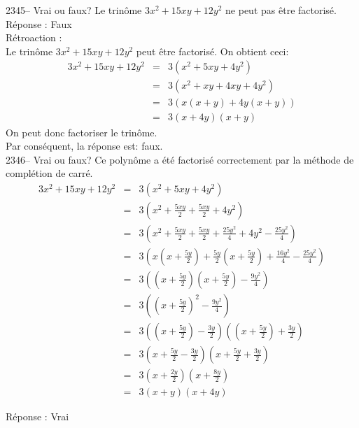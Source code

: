 \documentclass[letterpaper, 12pt]{article}
\begin{document}
2345-- Vrai ou faux? Le trin\^ome $3x^{2}+15xy+12y^{2}$ ne peut pas \^etre factoris\'e.\\

R\'eponse : Faux\\

R\'etroaction :\\
Le trin\^ome $3x^{2}+15xy+12y^{2}$ peut \^etre factoris\'e. On obtient ceci:
\begin{eqnarray*}
3x^{2}+15xy+12y^{2}&=&3(x^{2}+5xy+4y^{2})\\[2mm]
&=&3\left( x^{2}+xy+4xy+4y^{2}\right) \\[2mm]
&=&3\left( x(x+y)+4y(x+y)\right) \\[2mm]
&=&3(x+4y)(x+y)
\end{eqnarray*}
On peut donc factoriser le trin\^ome.\\
Par cons\'equent, la r\'eponse est: faux.\\

2346-- Vrai ou faux? Ce polyn\^ome a \'et\'e factoris\'e correctement par la m\'ethode de compl\'etion de carr\'e.
\begin{eqnarray*}
3x^{2}+15xy+12y^{2}&=&3(x^{2}+5xy+4y^{2})\\[2mm]
&=&3\left(x^{2}+\frac{5xy}{2}+\frac{5xy}{2}+4y^{2}\right)\\[2mm]
&=&3\left(x^{2}+\frac{5xy}{2}+\frac{5xy}{2}+\frac{25y^{2}}{4}+4y^{2}-\frac{25y^{2}}{4}\right)\\[2mm]
&=&3\left(x\left(x+\frac{5y}{2}\right)+\frac{5y}{2}\left(x+\frac{5y}{2}\right)+ \frac{16y^{2}}{4}-\frac{25y^{2}}{4}\right)\\[2mm]
&=&3\left(\left(x+\frac{5y}{2}\right)\left(x+\frac{5y}{2}\right)-\frac{9y^{2}}{4}\right)\\[2mm]
&=&3\left(\left(x+\frac{5y}{2}\right)^{2}-\frac{9y^{2}}{4}\right)\\[2mm]
&=&3\left(\left(x+\frac{5y}{2}\right)-\frac{3y}{2}\right) \left(\left(x+\frac{5y}{2}\right)+\frac{3y}{2}\right)\\[2mm]
&=&3\left(x+\frac{5y}{2}-\frac{3y}{2}\right) \left(x+\frac{5y}{2}+\frac{3y}{2}\right)\\[2mm]
&=&3\left(x+\frac{2y}{2}\right) \left(x+\frac{8y}{2}\right)\\[2mm]
&=&3\left(x+y\right) \left(x+4y\right)
\end{eqnarray*}

R\'eponse : Vrai\\
\end{document}
